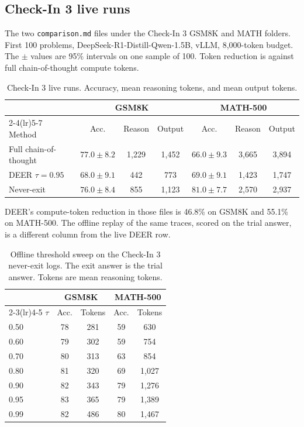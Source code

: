 \subsection{Check-In 3 live runs}
The two \texttt{comparison.md} files under the Check-In 3 GSM8K and MATH folders.
First 100 problems, DeepSeek-R1-Distill-Qwen-1.5B, vLLM, 8{,}000-token budget.
The $\pm$ values are 95\% intervals on one sample of 100.
Token reduction is against full chain-of-thought compute tokens.

\begin{table}[!t]
\caption{Check-In 3 live runs. Accuracy, mean reasoning tokens, and mean output tokens.}
\label{tab:c3live}
\centering
\scriptsize
\begin{tabular}{@{}lcccccc@{}}
\toprule
 & \multicolumn{3}{c}{GSM8K} & \multicolumn{3}{c}{MATH-500} \\
\cmidrule(lr){2-4}\cmidrule(lr){5-7}
Method & Acc. & Reason & Output & Acc. & Reason & Output \\
\midrule
Full chain-of-thought & $77.0\pm 8.2$ & 1{,}229 & 1{,}452 & $66.0\pm 9.3$ & 3{,}665 & 3{,}894 \\
DEER $\tau=0.95$ & $68.0\pm 9.1$ & 442 & 773 & $69.0\pm 9.1$ & 1{,}423 & 1{,}747 \\
Never-exit & $76.0\pm 8.4$ & 855 & 1{,}123 & $81.0\pm 7.7$ & 2{,}570 & 2{,}937 \\
\bottomrule
\end{tabular}
\end{table}

DEER's compute-token reduction in those files is 46.8\% on GSM8K and 55.1\% on MATH-500.
The offline replay of the same traces, scored on the trial answer, is a different column from the live DEER row.

\begin{table}[!t]
\caption{Offline threshold sweep on the Check-In 3 never-exit logs. The exit answer is the trial answer. Tokens are mean reasoning tokens.}
\label{tab:c3sweep}
\centering
\footnotesize
\begin{tabular}{@{}lcccc@{}}
\toprule
 & \multicolumn{2}{c}{GSM8K} & \multicolumn{2}{c}{MATH-500} \\
\cmidrule(lr){2-3}\cmidrule(lr){4-5}
$\tau$ & Acc. & Tokens & Acc. & Tokens \\
\midrule
0.50 & 78 & 281 & 59 & 630 \\
0.60 & 79 & 302 & 59 & 754 \\
0.70 & 80 & 313 & 63 & 854 \\
0.80 & 81 & 320 & 69 & 1{,}027 \\
0.90 & 82 & 343 & 79 & 1{,}276 \\
0.95 & 83 & 365 & 79 & 1{,}389 \\
0.99 & 82 & 486 & 80 & 1{,}467 \\
\bottomrule
\end{tabular}
\end{table}

